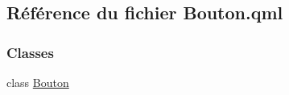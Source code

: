\hypertarget{_bouton_8qml}{}\subsection{Référence du fichier Bouton.\+qml}
\label{_bouton_8qml}
\subsubsection*{Classes}
\begin{DoxyCompactItemize}
\item 
class \hyperlink{class_bouton}{Bouton}
\end{DoxyCompactItemize}
